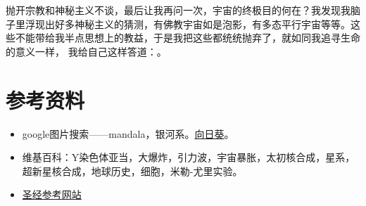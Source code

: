\documentclass[12pt]{exam}%
\begin{document}
抛开宗教和神秘主义不谈，最后让我再问一次，宇宙的终极目的何在？我发现我脑子里浮现出好多神秘主义的猜测，有佛教宇宙如是泡影，有多态平行宇宙等等。这些不能带给我半点思想上的教益，于是我把这些都统统抛弃了，就如同我追寻生命的意义一样， 我给自己这样答道：。



\section{参考资料}
\begin{itemize}
\item google图片搜索——mandala，银河系。\href{http://amuseum.cdstm.cn/AMuseum/math/6/608/6_608_1002.htm}{向日葵}。
\item 维基百科：Y染色体亚当，大爆炸，引力波，宇宙暴胀，太初核合成，星系，超新星核合成，地球历史，细胞，米勒-尤里实验。 
\item \href{http://bible.kuanye.net/hhb/}{圣经参考网站} 
\end{itemize}
\end{document}
